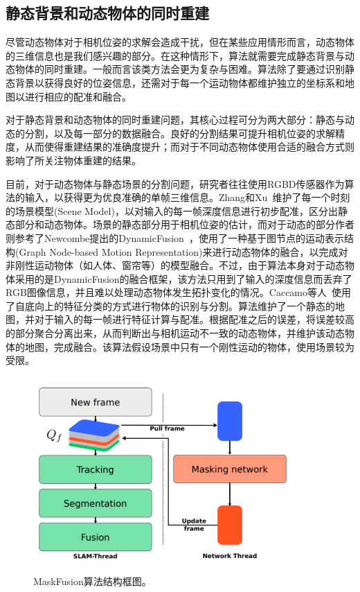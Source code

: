 \subsection{静态背景和动态物体的同时重建}
\label{subsec:static_and_dynamic}
\newpage
尽管动态物体对于相机位姿的求解会造成干扰，但在某些应用情形而言，动态物体的三维信息也是我们感兴趣的部分。在这种情形下，算法就需要完成静态背景与动态物体的同时重建。一般而言该类方法会更为复杂与困难。算法除了要通过识别静态背景以获得良好的位姿信息，还需对于每一个运动物体都维护独立的坐标系和地图以进行相应的配准和融合。

对于静态背景和动态物体的同时重建问题，其核心过程可分为两大部分：静态与动态的分割，以及每一部分的数据融合。良好的分割结果可提升相机位姿的求解精度，从而使得重建结果的准确度提升；而对于不同动态物体使用合适的融合方式则影响了所关注物体重建的结果。

目前，对于动态物体与静态场景的分割问题，研究者往往使用RGBD传感器作为算法的输入，以获得更为优良准确的单帧三维信息。Zhang和Xu~\cite{2017MixedFusion}维护了每一个时刻的场景模型(Scene Model)，以对输入的每一帧深度信息进行初步配准，区分出静态部分和动态物体。场景的静态部分用于相机位姿的估计，而对于动态的部分作者则参考了Newcombe提出的DynamicFusion~\cite{2015DynamicFusion}，使用了一种基于图节点的运动表示结构(Graph Node-based Motion Representation)来进行动态物体的融合，以完成对非刚性运动物体（如人体、窗帘等）的模型融合。不过，由于算法本身对于动态物体采用的是DynamicFusion的融合框架，该方法只用到了输入的深度信息而丢弃了RGB图像信息，并且难以处理动态物体发生拓扑变化的情况。Caccamo等人~\cite{2017Joint3D}使用了自底向上的特征分类的方式进行物体的识别与分割。算法维护了一个静态的地图，并对于输入的每一帧进行特征计算与配准。根据配准之后的误差，将误差较高的部分聚合分离出来，从而判断出与相机运动不一致的动态物体，并维护该动态物体的地图，完成融合。该算法假设场景中只有一个刚性运动的物体，使用场景较为受限。

\begin{figure}[htbp]
	\centering
	\includegraphics[width=0.9\textwidth]{figs/2-2/maskfusion.png} 
	\label{fig:MaskFusion-framework}
	\caption{MaskFusion算法结构框图。}
\end{figure}

